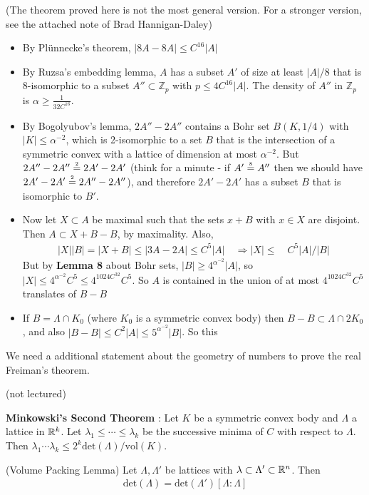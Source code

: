 \documentclass[12pt,a4paper]{report}
\newcommand{\xeq}[1]{\stackrel{\mathclap{\normalfont\mbox{\tiny{#1}}}}{=}}
\begin{document}
(The theorem proved here is not the most general version. For a stronger version, see the attached note of Brad Hannigan-Daley)
\s

\begin{itemize}
\item By Pl\"{u}nnecke's theorem, $|8A - 8A| \leq C^{16}|A|$
\item By Ruzsa's embedding lemma, $A$ has a subset $A'$ of size at least $|A|/8$ that is 8-isomorphic to a subset $A'' \subset\mathbb{Z}_p$ with $p \leq 4C^{16}|A|$. The density of $A''$ in $\mathbb{Z}_p$ is $\alpha \geq \frac{1}{32C^{16}}$.
\item By Bogolyubov's lemma, $2A'' - 2A''$ contains a Bohr set $B(K,1/4)$ with $|K|\leq \alpha^{-2}$, which is 2-isomorphic to a set $B$ that is the intersection of a symmetric convex with a lattice of dimension at most $\alpha^{-2}$. But $2A'' - 2A'' \xeq{2} 2A' -2A'$ (think for a minute - if $A' \xeq{8} A''$ then we should have $2A'-2A' \xeq{2} 2A''-2A''$), and therefore $2A' - 2A'$ has a subset $B$ that is isomorphic to $B'$. 
\item Now let $X \subset A$ be maximal such that the sets $x + B$ with $x\in X$ are disjoint. Then $A \subset X + B-B$, by maximality. Also,
\begin{align*}
|X||B| = |X+B| \leq |3A-2A| \leq C^5 |A| \quad \Rightarrow |X|\leq \quad C^5 |A|/|B|
\end{align*}
But by \textbf{Lemma 8} about Bohr sets, $|B| \geq 4^{\alpha^{-2}} |A|$, so $|X| \leq 4^{\alpha^{-2}}C^5 \leq 4^{1024 C^{32}} C^5$. So $A$ is contained in the union of at most $4^{1024 C^{32}} C^5$ translates of $B-B$
\item If $B = \Lambda \cap K_0$ (where $K_0$ is a symmetric convex body) then $B-B \subset \Lambda \cap 2K_0$, and also $|B-B|\leq C^2 |A| \leq 5^{\alpha^{-2}}|B|$. So this 
\end{itemize}

We need a additional statement about the geometry of numbers to prove the real Freiman's theorem.
\s

\digression

(not lectured)
\s

\textbf{Minkowski's Second Theorem} : Let $K$ be a symmetric convex body and $\Lambda$ a lattice in $\mathbb{R}^k$. Let $\lambda_1 \leq \cdots \leq \lambda_k$ be the successive minima of $C$ with respect to $\Lambda$. Then $\lambda_1 \cdots \lambda_k \leq 2^k \text{det}(\Lambda)/\text{vol}(K)$.
\s

\lem (Volume Packing Lemma) Let $\Lambda, \Lambda'$ be lattices with $\lambda \subset \Lambda' \subset \mathbb{R}^n$. Then
\begin{align*}
\text{det}(\Lambda) = \text{det}(\Lambda')[\Lambda : \Lambda]
\end{align*}
\s
\end{document}
